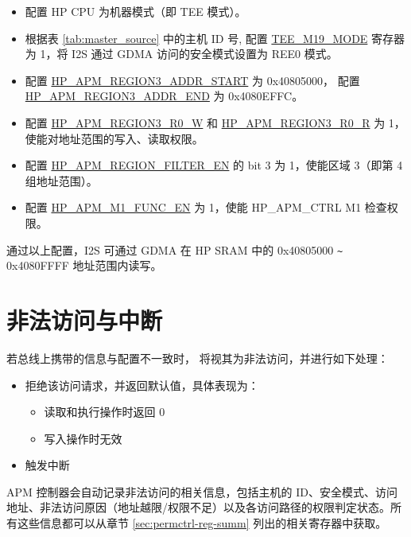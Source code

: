 \documentclass[main\_\_CN.tex]{subfiles}
\begin{document}
\begin{itemize}
    \item 配置 HP CPU 为机器模式（即 TEE 模式）。

    \item 根据表 \ref{tab:master_source} 中的主机 ID 号, 配置 \hyperref[fielddesc:TEEMNMODE]{TEE\_M19\_MODE} 寄存器为 1，将 I2S 通过 GDMA 访问的安全模式设置为 REE0 模式。

    \item 配置 \hyperref[regdesc:HPAPMREGIONNADDRSTARTREG]{HP\_APM\_REGION3\_ADDR\_START} 为 0x40805000， 配置 \hyperref[regdesc:HPAPMREGIONNADDRSTARTREG]{HP\_APM\_REGION3\_ADDR\_END} 为 0x4080EFFC。

    \item 配置 \hyperref[fielddesc:HPAPMREGIONNR0W]{HP\_APM\_REGION3\_R0\_W} 和 \hyperref[fielddesc:HPAPMREGIONNR0R]{HP\_APM\_REGION3\_R0\_R} 为 1，使能对地址范围的写入、读取权限。

    \item 配置 \hyperref[fielddesc:HPAPMREGIONFILTEREN]{HP\_APM\_REGION\_FILTER\_EN} 的 bit 3 为 1，使能区域 3（即第 4 组地址范围）。

    \item 配置 \hyperref[fielddesc:HPAPMM1FUNCEN]{HP\_APM\_M1\_FUNC\_EN} 为 1，使能 HP\_APM\_CTRL M1 检查权限。

\end{itemize}

通过以上配置，I2S 可通过 GDMA 在 HP SRAM 中的 0x40805000 \verb+~+ 0x4080FFFF 地址范围内读写。

\section{非法访问与中断}

若总线上携带的信息与配置不一致时，\chipname{} 将视其为非法访问，并进行如下处理：

\begin{itemize}
    \item 拒绝该访问请求，并返回默认值，具体表现为：
    \begin{itemize}
        \item 读取和执行操作时返回 0
        \item 写入操作时无效
    \end{itemize}
    \item 触发中断
\end{itemize}

APM 控制器会自动记录非法访问的相关信息，包括主机的 ID、安全模式、访问地址、非法访问原因（地址越限/权限不足）以及各访问路径的权限判定状态。所有这些信息都可以从章节 \ref{sec:permctrl-reg-summ}  列出的相关寄存器中获取。
\end{document}
